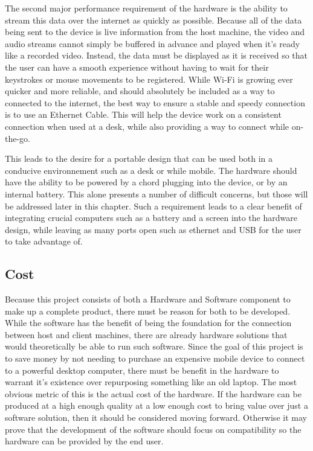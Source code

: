 The second major performance requirement of the hardware is the ability to stream this data over the internet as quickly as possible.
Because all of the data being sent to the device is live information from the host machine, the video and audio streams cannot simply be buffered in advance and played when it's ready like a recorded video.
Instead, the data must be displayed as it is received so that the user can have a smooth experience without having to wait for their keystrokes or mouse movements to be registered.
While Wi-Fi is growing ever quicker and more reliable, and should absolutely be included as a way to connected to the internet, the best way to ensure a stable and speedy connection is to use an Ethernet Cable.
This will help the device work on a consistent connection when used at a desk, while also providing a way to connect while on-the-go.

This leads to the desire for a portable design that can be used both in a conducive environnement such as a desk or while mobile.
The hardware should have the ability to be powered by a chord plugging into the device, or by an internal battery.
This alone presents a number of difficult concerns, but those will be addressed later in this chapter.
Such a requirement leads to a clear benefit of integrating crucial computers such as a battery and a screen into the hardware design, while leaving as many ports open such as ethernet and USB for the user to take advantage of.


\subsection{Cost}\label{sec:HardwareCost}

Because this project consists of both a Hardware and Software component to make up a complete product, there must be reason for both to be developed.
While the software has the benefit of being the foundation for the connection between host and client machines, there are already hardware solutions that would theoretically be able to run such software.
Since the goal of this project is to save money by not needing to purchase an expensive mobile device to connect to a powerful desktop computer, there must be benefit in the hardware to warrant it's existence over repurposing something like an old laptop.
The most obvious metric of this is the actual cost of the hardware.
If the hardware can be produced at a high enough quality at a low enough cost to bring value over just a software solution, then it should be considered moving forward.
Otherwise it may prove that the development of the software should focus on compatibility so the hardware can be provided by the end user.

